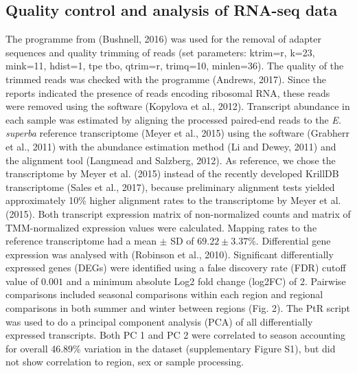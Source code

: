 \subsection*{Quality control and analysis of RNA-seq data}

The programme  from  (Bushnell, 2016)
was used for the removal of adapter sequences and quality trimming of reads
(set parameters: ktrim=r, k=23, mink=11, hdist=1, tpe tbo, qtrim=r, trimq=10,
minlen=36). The quality of the trimmed reads was checked with the programme
 (Andrews, 2017). Since the  reports
indicated the presence of reads encoding ribosomal RNA, these reads were
removed using the software  (Kopylova et al., 2012). Transcript
abundance in each sample was estimated by aligning the processed paired-end
reads to the \textit{E. superba} reference transcriptome (Meyer et al., 2015)
using the software  (Grabherr et al., 2011) with the
abundance estimation method  (Li and Dewey, 2011) and the
alignment tool  (Langmead and Salzberg, 2012). As
reference, we chose the transcriptome by Meyer et al. (2015) instead of the
recently developed KrillDB transcriptome (Sales et al., 2017), because
preliminary alignment tests yielded approximately 10\% higher alignment rates
to the transcriptome by Meyer et al. (2015). Both transcript expression matrix
of non-normalized counts and matrix of TMM-normalized expression values were
calculated. Mapping rates to the reference transcriptome had a mean $\pm$ SD of
$69.22 \pm 3.37$\%. Differential gene expression was analysed with 
(Robinson et al., 2010). Significant differentially expressed genes (DEGs) were
identified using a false discovery rate (FDR) cutoff value of $0.001$ and a
minimum absolute Log2 fold change (log2FC) of 2. Pairwise comparisons included
seasonal comparisons within each region and regional comparisons in both summer
and winter between regions (Fig. 2). The PtR script was used to do a principal
component analysis (PCA) of all differentially expressed transcripts. Both PC 1
and PC 2 were correlated to season accounting for overall 46.89\% variation in
the dataset (supplementary Figure S1), but did not show correlation to region,
sex or sample processing.

